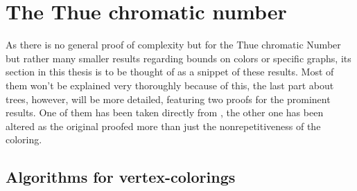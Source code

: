 \documentclass[12pt,a4paper]{article}
\begin{document}
\section{The Thue chromatic number}

As there is no general proof of complexity but for the Thue chromatic Number but rather many smaller results regarding bounds on colors or specific graphs, its section in this thesis is to be thought of as a snippet of these results. Most of them won't be explained very thoroughly because of this, the last part about trees, however, will be more detailed, featuring two proofs for the prominent results. One of them has been taken directly from \citep{Bresar2007}, the other one has been altered as the original proofed more than just the nonrepetitiveness of the coloring.

\subsection{Algorithms for vertex-colorings}
\end{document}
